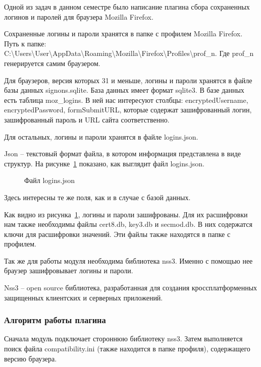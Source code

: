 Одной из задач в данном семестре было написание плагина сбора сохраненных логинов и паролей для браузера Mozilla Firefox.

Сохраненные логины и пароли хранятся в папке с профилем Mozilla Firefox. Путь к папке: C:\textbackslash Users\textbackslash User\textbackslash AppData\textbackslash Roaming\textbackslash Mozilla\textbackslash Firefox\textbackslash Profiles\textbackslash prof\_n. Где prof\_n генерируется самим браузером.

Для браузеров, версия которых 31 и меньше, логины и пароли хранятся в файле базы данных signons.sqlite. База данных имеет формат sqlite3. В базе данных есть таблица moz\_logins. В ней нас интересуют столбцы: encryptedUsername, encryptedPassword, formSubmitURL, которые содержат зашифрованный логин, зашифрованный пароль и URL сайта соответственно.

Для остальных, логины и пароли хранятся в файле logins.json.

Json – текстовый формат файла, в котором информация представлена в виде структур. На рисунке~\ref{teresh_1:teresh_1} показано, как выглядит файл logins.json.

\begin{figure}[h!]
\caption{Файл logins.json}
\label{teresh_1:teresh_1}
\end{figure}

Здесь интересны те же поля, как и в случае с базой данных.

Как видно из рисунка~\ref{teresh_1:teresh_1}, логины и пароли зашифрованы. Для их расшифровки нам также необходимы файлы cert8.db, key3.db и secmod.db. В них содержатся ключи для расшифровки значений. Эти файлы также находятся в папке с профилем.

Так же для работы модуля необходима библиотека nss3. Именно с помощью нее браузер зашифровывает логины и пароли.

Nss3 – open source библиотека, разработанная для создания кроссплатформенных защищенных клиентских и серверных приложений.

\subsubsection{Алгоритм работы плагина}

Сначала модуль подключает стороннюю библиотеку nss3. Затем выполняется поиск файла compatibility.ini (также находится в папке профиля), содержащего версию браузера.

